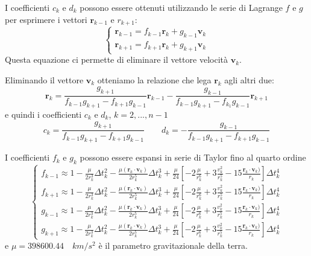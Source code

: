 \documentclass{beamer}
\begin{document}
\begin{frame}[plain]
I coefficienti $c_k$ e $d_k$ possono essere ottenuti utilizzando le serie di Lagrange $f$ e $g$ per esprimere i vettori $\textbf{r}_{k-1}$ e $r_{k+1}$:
\begin{equation}
\begin{cases}
\textbf{r}_{k-1}=f_{k-1}\textbf{r}_k+g_{k-1}\textbf{v}_k \\
\textbf{r}_{k+1}=f_{k+1}\textbf{r}_k+g_{k+1}\textbf{v}_k
\end{cases}
\end{equation}
Questa equazione ci permette di eliminare il vettore velocit\`a $\textbf{v}_k$.
\end{frame}
\begin{frame}[plain]
Eliminando il vettore $\textbf{v}_k$ otteniamo la relazione che lega $\textbf{r}_k$ agli altri due:  \begin{equation}
\textbf{r}_k=\frac{g_{k+1}}{f_{k-1} g_{k+1}-f_{k+1} g_{k-1}} \textbf{r}_{k-1}- \frac{g_{k-1}}{f_{k-1} g_{k+1} - f_{k_1} g_{k-1}} \textbf{r}_{k+1}
\end{equation}
e quindi i coefficienti $c_k$ e $d_k$, $k=2,..., n-1$
\begin{equation}
c_k=\frac{g_{k+1}}{f_{k-1}g_{k+1}-f_{k+1}g_{k-1}} \qquad d_k=-\frac{g_{k-1}}{f_{k-1}g_{k+1}-f_{k+1}g_{k-1}}
\end{equation}
\end{frame}
\begin{frame}[plain]
I coefficienti $f_k$ e $g_k$ possono essere espansi in serie di Taylor fino al quarto ordine \begin{equation*}
\begin{cases}
f_{k-1} \approx 1-\frac{\mu}{2 r_k^3}\Delta t^2_k - \frac{\mu(\textbf{r}_k \cdot \textbf{v}_k)}{2 r_k^5} \Delta t^3_k + \frac{\mu}{24}[-2\frac{\mu}{r_k^6} + 3 \frac{v_k^2}{r_k^5} - 15 \frac{\textbf{r}_k \cdot \textbf{v}_k)}{r_k}]\Delta t ^4_k \\
f_{k+1}\approx 1-\frac{\mu}{2 r_k^3}\Delta t^2_k - \frac{\mu(\textbf{r}_k \cdot \textbf{v}_k)}{2 r_k^5} \Delta t^3_k + \frac{\mu}{24}[-2\frac{\mu}{r_k^6} + 3 \frac{v_k^2}{r_k^5} - 15 \frac{\textbf{r}_k \cdot \textbf{v}_k)}{r_k}]\Delta t ^4_k\\
g_{k-1} \approx 1-\frac{\mu}{2 r_k^3}\Delta t^2_k - \frac{\mu(\textbf{r}_k  \cdot \textbf{v}_k)}{2 r_k^5} \Delta t^3_k + \frac{\mu}{24}[-2\frac{\mu}{r_k^6} + 3 \frac{v_k^2}{r_k^5} - 15 \frac{\textbf{r}_k \cdot \textbf{v}_k)}{r_k}]\Delta t ^4_k\\
g_{k+1} \approx 1-\frac{\mu}{2 r_k^3}\Delta t^2_k - \frac{\mu(\textbf{r}_k \cdot \textbf{v}_k)}{2 r_k^5} \Delta t^3_k + \frac{\mu}{24}[-2\frac{\mu}{r_k^6} + 3 \frac{v_k^2}{r_k^5} - 15 \frac{\textbf{r}_k \cdot \textbf{v}_k)}{r_k}]\Delta t ^4_k
\end{cases}
\end{equation*}
e $\mu=398600.44 \quad km/s^2$ \`e il parametro gravitazionale della terra.
\end{frame}
\end{document}
